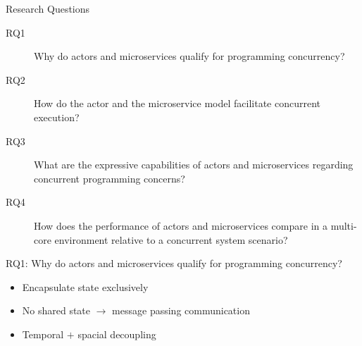 \documentclass{beamer}
\begin{document}
\begin{frame}{Research Questions}


\begin{description}
  \item[RQ1] Why do actors and microservices qualify for programming concurrency?
  \item[RQ2] How do the actor and the microservice model facilitate concurrent execution?
  \item[RQ3] What are the expressive capabilities of actors and microservices regarding concurrent programming concerns?
  \item[RQ4] How does the performance of actors and microservices compare in a multi-core environment relative to a concurrent system scenario?
\end{description}

\end{frame}


\begin{frame}{RQ1: Why do actors and microservices qualify for programming concurrency?}

\begin{itemize}
  \item Encapsulate state exclusively
  \item No shared state $\rightarrow$ message passing communication
  \item Temporal $+$ spacial decoupling 
\end{itemize}

\end{frame}

\end{document}
